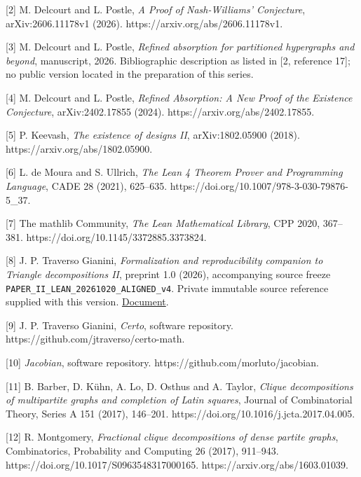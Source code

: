 \documentclass[english,11pt,a4paper]{article}
\begin{document}
{[}2{]} M. Delcourt and L. Postle, \emph{A Proof of Nash-Williams' Conjecture}, arXiv:2606.11178v1 (2026). https://arxiv.org/abs/2606.11178v1.

{[}3{]} M. Delcourt and L. Postle, \emph{Refined absorption for partitioned hypergraphs and beyond}, manuscript, 2026. Bibliographic description as listed in {[}2, reference 17{]}; no public version located in the preparation of this series.

{[}4{]} M. Delcourt and L. Postle, \emph{Refined Absorption: A New Proof of the Existence Conjecture}, arXiv:2402.17855 (2024). https://arxiv.org/abs/2402.17855.

{[}5{]} P. Keevash, \emph{The existence of designs II}, arXiv:1802.05900 (2018). https://arxiv.org/abs/1802.05900.

{[}6{]} L. de Moura and S. Ullrich, \emph{The Lean 4 Theorem Prover and Programming Language}, CADE 28 (2021), 625--635. https://doi.org/10.1007/978-3-030-79876-5\_37.

{[}7{]} The mathlib Community, \emph{The Lean Mathematical Library}, CPP 2020, 367--381. https://doi.org/10.1145/3372885.3373824.

{[}8{]} J. P. Traverso Gianini, \emph{Formalization and reproducibility companion to Triangle decompositions II}, preprint 1.0 (2026), accompanying source freeze \texttt{PAPER\_\allowbreak{}II\_\allowbreak{}LEA\allowbreak{}N\_\allowbreak{}20261020\_\allowbreak{}A\allowbreak{}LIGNED\_\allowbreak{}v4}. Private immutable source reference supplied with this version. \href{https://github.com/jtraverso/nash-williams-triangle-decompositions/blob/main/preprints/PAPER_II/05_formalization/FORMALIZATION_COMPANION_preprint_v1.0_en.md}{Document}.

{[}9{]} J. P. Traverso Gianini, \emph{Certo}, software repository. https://github.com/jtraverso/certo-math.

{[}10{]} \emph{Jacobian}, software repository. https://github.com/morluto/jacobian.

{[}11{]} B. Barber, D. Kühn, A. Lo, D. Osthus and A. Taylor, \emph{Clique decompositions of multipartite graphs and completion of Latin squares}, Journal of Combinatorial Theory, Series A 151 (2017), 146--201. https://doi.org/10.1016/j.jcta.2017.04.005.

{[}12{]} R. Montgomery, \emph{Fractional clique decompositions of dense partite graphs}, Combinatorics, Probability and Computing 26 (2017), 911--943. https://doi.org/10.1017/S0963548317000165. https://arxiv.org/abs/1603.01039.
\end{document}
